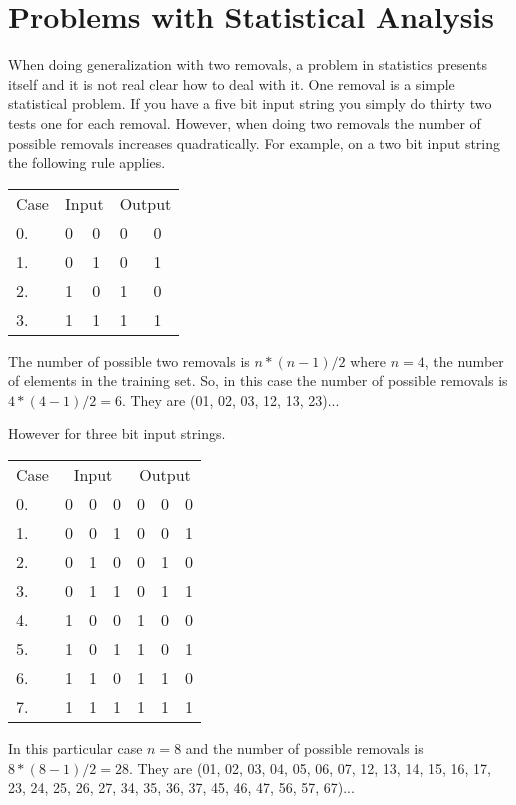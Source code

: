 \section{Problems with Statistical Analysis}

	When doing generalization with two removals, a problem in
statistics presents itself and it is not real clear how to deal with
it.  One removal is a simple statistical problem.  If you have a five
bit input string you simply do thirty two tests one for each removal.
However, when doing two removals the number of possible removals
increases quadratically.  For example, on a two bit input string the
following rule applies.

\begin{center}
\begin{tabular}{lllll}
\multicolumn{1}{c}{Case} &
\multicolumn{2}{c}{Input} &
\multicolumn{2}{c}{Output} \\
0. & 0 & 0 & 0 & 0 \\
1. & 0 & 1 & 0 & 1 \\
2. & 1 & 0 & 1 & 0 \\
3. & 1 & 1 & 1 & 1 
\end{tabular}
\end{center}

	The number of possible two removals is  $n * (n - 1) / 2$
where $n = 4$, the number of elements in the training set.  So, in this
case the number of possible removals is $4 * (4 - 1) / 2 = 6$.  They are
(01, 02, 03, 12, 13, 23)...

	However for three bit input strings.

\begin{center}
\begin{tabular}{lllllll}
\multicolumn{1}{c}{Case} &
\multicolumn{3}{c}{Input} &
\multicolumn{3}{c}{Output} \\
0. & 0 & 0 & 0 & 0 & 0 & 0 \\
1. & 0 & 0 & 1 & 0 & 0 & 1 \\
2. & 0 & 1 & 0 & 0 & 1 & 0 \\
3. & 0 & 1 & 1 & 0 & 1 & 1 \\
4. & 1 & 0 & 0 & 1 & 0 & 0 \\
5. & 1 & 0 & 1 & 1 & 0 & 1 \\
6. & 1 & 1 & 0 & 1 & 1 & 0 \\
7. & 1 & 1 & 1 & 1 & 1 & 1 
\end{tabular}
\end{center}

	In this particular case $n = 8$ and the number of possible
removals is $8 * (8 - 1) / 2 = 28$.  They are (01, 02, 03, 04, 05, 06,
07, 12, 13, 14, 15, 16, 17, 23, 24, 25, 26, 27, 34, 35, 36, 37, 45,
46, 47, 56, 57, 67)...

